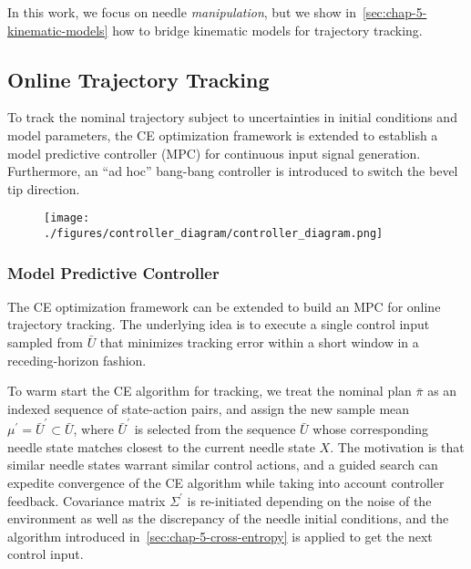 In this work, we focus on needle \textit{manipulation}, but we show in~\cref{sec:chap-5-kinematic-models} how to bridge kinematic models for trajectory tracking.

\subsection{Online Trajectory Tracking}
\label{sec:trajectory_tracking}

To track the nominal trajectory subject to uncertainties in initial conditions and model parameters, the CE optimization framework is extended to establish a model predictive controller (MPC) for continuous input signal generation. Furthermore, an ``ad hoc'' bang-bang controller is introduced to switch the bevel tip direction. 

\begin{figure}[ht]
  \centering
  \texttt{[image: ./figures/controller\_diagram/controller\_diagram.png]}
  \caption{}
  \label{fig:chap-5-controller-diagram}
\end{figure}

\subsubsection{Model Predictive Controller}
\label{sec:chap-5-mpc}
The CE optimization framework can be extended to build an MPC for online trajectory tracking. The underlying idea is to execute a single control input sampled from $\bar{U}$ that minimizes tracking error within a short window in a receding-horizon fashion.

To warm start the CE algorithm for tracking, we treat the nominal plan $\bar{\pi}$ as an indexed sequence of state-action pairs, and assign the new sample mean $\mu^{\prime} = \bar{U}^{\prime} \subset \bar{U}$, where $\bar{U}^{\prime}$ is selected from the sequence $\bar{U}$ whose corresponding needle state matches closest to the current needle state $X$. The motivation is that similar needle states warrant similar control actions, and a guided search can expedite convergence of the CE algorithm while taking into account controller feedback. Covariance matrix $\Sigma^{\prime}$ is re-initiated depending on the noise of the environment as well as the discrepancy of the needle initial conditions, and the algorithm introduced in~\cref{sec:chap-5-cross-entropy} is applied to get the next control input. 

